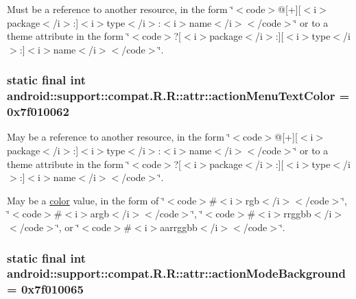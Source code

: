 Must be a reference to another resource, in the form \char`\"{}$<$code$>$@\mbox{[}+\mbox{]}\mbox{[}$<$i$>$package$<$/i$>$:\mbox{]}$<$i$>$type$<$/i$>$:$<$i$>$name$<$/i$>$$<$/code$>$\char`\"{} or to a theme attribute in the form \char`\"{}$<$code$>$?\mbox{[}$<$i$>$package$<$/i$>$:\mbox{]}\mbox{[}$<$i$>$type$<$/i$>$:\mbox{]}$<$i$>$name$<$/i$>$$<$/code$>$\char`\"{}. \hypertarget{classandroid_1_1support_1_1compat_1_1_r_1_1attr_1e338942a98d9ab72c9e7d7ad8e2768c}{
\subsubsection[{actionMenuTextColor}]{\setlength{\rightskip}{0pt plus 5cm}static final int android::support::compat.R.R::attr::actionMenuTextColor = 0x7f010062}}
\label{classandroid_1_1support_1_1compat_1_1_r_1_1attr_1e338942a98d9ab72c9e7d7ad8e2768c}


May be a reference to another resource, in the form \char`\"{}$<$code$>$@\mbox{[}+\mbox{]}\mbox{[}$<$i$>$package$<$/i$>$:\mbox{]}$<$i$>$type$<$/i$>$:$<$i$>$name$<$/i$>$$<$/code$>$\char`\"{} or to a theme attribute in the form \char`\"{}$<$code$>$?\mbox{[}$<$i$>$package$<$/i$>$:\mbox{]}\mbox{[}$<$i$>$type$<$/i$>$:\mbox{]}$<$i$>$name$<$/i$>$$<$/code$>$\char`\"{}. 

May be a \hyperlink{classandroid_1_1support_1_1compat_1_1_r_1_1color}{color} value, in the form of \char`\"{}$<$code$>$\#$<$i$>$rgb$<$/i$>$$<$/code$>$\char`\"{}, \char`\"{}$<$code$>$\#$<$i$>$argb$<$/i$>$$<$/code$>$\char`\"{}, \char`\"{}$<$code$>$\#$<$i$>$rrggbb$<$/i$>$$<$/code$>$\char`\"{}, or \char`\"{}$<$code$>$\#$<$i$>$aarrggbb$<$/i$>$$<$/code$>$\char`\"{}. \hypertarget{classandroid_1_1support_1_1compat_1_1_r_1_1attr_4fb2c4ba3556188fc73486054171eb51}{
\subsubsection[{actionModeBackground}]{\setlength{\rightskip}{0pt plus 5cm}static final int android::support::compat.R.R::attr::actionModeBackground = 0x7f010065}}
\label{classandroid_1_1support_1_1compat_1_1_r_1_1attr_4fb2c4ba3556188fc73486054171eb51}


